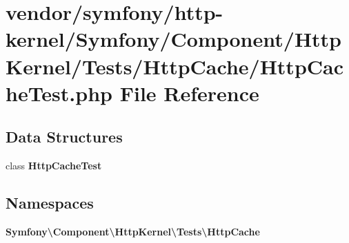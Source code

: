 \section{vendor/symfony/http-\/kernel/\+Symfony/\+Component/\+Http\+Kernel/\+Tests/\+Http\+Cache/\+Http\+Cache\+Test.php File Reference}
\label{_http_cache_test_8php}
\subsection*{Data Structures}
\begin{DoxyCompactItemize}
\item 
class {\bf Http\+Cache\+Test}
\end{DoxyCompactItemize}
\subsection*{Namespaces}
\begin{DoxyCompactItemize}
\item 
 {\bf Symfony\textbackslash{}\+Component\textbackslash{}\+Http\+Kernel\textbackslash{}\+Tests\textbackslash{}\+Http\+Cache}
\end{DoxyCompactItemize}
